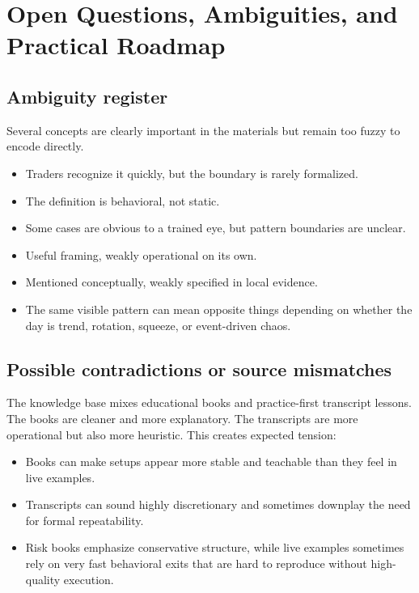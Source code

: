 \section{Open Questions, Ambiguities, and Practical Roadmap}

\subsection{Ambiguity register}

Several concepts are clearly important in the materials but remain too fuzzy to encode directly.

\begin{itemize}[leftmargin=1.4em]
  \item {} Traders recognize it quickly, but the boundary is
        rarely formalized.
  \item {} The definition is behavioral, not static.
  \item {} Some cases are obvious to a trained eye, but pattern boundaries
        are unclear.
  \item {} Useful framing, weakly operational on its own.
  \item {} Mentioned conceptually, weakly specified in local evidence.
  \item {} The same visible pattern can mean opposite things depending on
        whether the day is trend, rotation, squeeze, or event-driven chaos.
\end{itemize}

\subsection{Possible contradictions or source mismatches}

The knowledge base mixes educational books and practice-first transcript lessons. The books are
cleaner and more explanatory. The transcripts are more operational but also more heuristic. This
creates expected tension:

\begin{itemize}[leftmargin=1.4em]
  \item Books can make setups appear more stable and teachable than they feel in live examples.
  \item Transcripts can sound highly discretionary and sometimes downplay the need for formal
        repeatability.
  \item Risk books emphasize conservative structure, while live examples sometimes rely on very fast
        behavioral exits that are hard to reproduce without high-quality execution.
\end{itemize}

